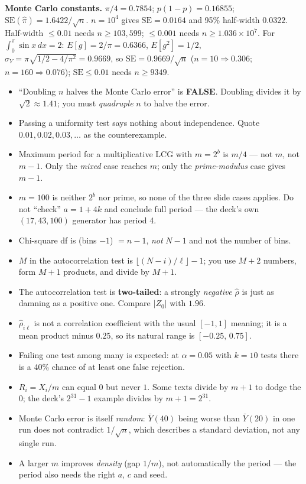 \begin{numbox}
\smallskip
\textbf{Monte Carlo constants.} $\pi/4 = 0.7854$; $p(1-p)=0.16855$; $\mathrm{SE}(\hat\pi)=1.6422/\sqrt n$.
$n=10^4$ gives $\mathrm{SE}=0.0164$ and 95\% half-width $0.0322$.
Half-width $\le0.01$ needs $n\ge 103{,}599$; $\le0.001$ needs $n\ge 1.036\times10^7$.
For $\int_0^{\pi}\sin x\,dx=2$: $E[g]=2/\pi=0.6366$, $E[g^2]=1/2$, $\sigma_Y=\pi\sqrt{1/2-4/\pi^2}=0.9669$, so $\mathrm{SE}=0.9669/\sqrt n$ ($n{=}10\Rightarrow0.306$; $n{=}160\Rightarrow0.076$); $\mathrm{SE}\le0.01$ needs $n\ge 9349$.
\end{numbox}

\begin{trapbox}
\begin{itemize}
\item ``Doubling $n$ halves the Monte Carlo error'' is \textbf{FALSE}. Doubling divides it by $\sqrt2\approx1.41$; you must \emph{quadruple} $n$ to halve the error.
\item Passing a uniformity test says nothing about independence. Quote $0.01,0.02,0.03,\dots$ as the counterexample.
\item Maximum period for a multiplicative LCG with $m=2^b$ is $m/4$ --- not $m$, not $m-1$. Only the \emph{mixed} case reaches $m$; only the \emph{prime-modulus} case gives $m-1$.
\item $m=100$ is neither $2^b$ nor prime, so none of the three slide cases applies. Do not ``check'' $a=1+4k$ and conclude full period --- the deck's own $(17,43,100)$ generator has period 4.
\item Chi-square df is (bins $-1$) $= n-1$, \emph{not} $N-1$ and not the number of bins.
\item $M$ in the autocorrelation test is $\lfloor (N-i)/\ell\rfloor - 1$; you use $M+2$ numbers, form $M+1$ products, and divide by $M+1$.
\item The autocorrelation test is \textbf{two-tailed}: a strongly \emph{negative} $\hat\rho$ is just as damning as a positive one. Compare $|Z_0|$ with $1.96$.
\item $\hat\rho_{i\ell}$ is not a correlation coefficient with the usual $[-1,1]$ meaning; it is a mean product minus $0.25$, so its natural range is $[-0.25,\,0.75]$.
\item Failing one test among many is expected: at $\alpha=0.05$ with $k=10$ tests there is a 40\% chance of at least one false rejection.
\item $R_i=X_i/m$ can equal $0$ but never $1$. Some texts divide by $m+1$ to dodge the $0$; the deck's $2^{31}-1$ example divides by $m+1=2^{31}$.
\item Monte Carlo error is itself \emph{random}: $\bar Y(40)$ being worse than $\bar Y(20)$ in one run does not contradict $1/\sqrt n$, which describes a standard deviation, not any single run.
\item A larger $m$ improves \emph{density} (gap $1/m$), not automatically the period --- the period also needs the right $a$, $c$ and seed.
\end{itemize}
\end{trapbox}
